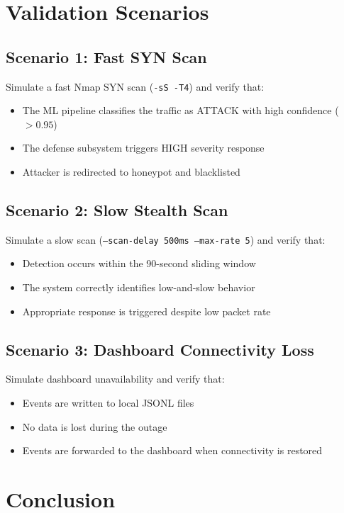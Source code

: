 \documentclass[12pt,a4paper]{report}
\begin{document}
\section{Validation Scenarios}

\subsection{Scenario 1: Fast SYN Scan}

Simulate a fast Nmap SYN scan (\texttt{-sS -T4}) and verify that:
\begin{itemize}
    \item The ML pipeline classifies the traffic as ATTACK with high confidence ($> 0.95$)
    \item The defense subsystem triggers HIGH severity response
    \item Attacker is redirected to honeypot and blacklisted
\end{itemize}

\subsection{Scenario 2: Slow Stealth Scan}

Simulate a slow scan (\texttt{--scan-delay 500ms --max-rate 5}) and verify that:
\begin{itemize}
    \item Detection occurs within the 90-second sliding window
    \item The system correctly identifies low-and-slow behavior
    \item Appropriate response is triggered despite low packet rate
\end{itemize}

\subsection{Scenario 3: Dashboard Connectivity Loss}

Simulate dashboard unavailability and verify that:
\begin{itemize}
    \item Events are written to local JSONL files
    \item No data is lost during the outage
    \item Events are forwarded to the dashboard when connectivity is restored
\end{itemize}

\section{Conclusion}
\end{document}
